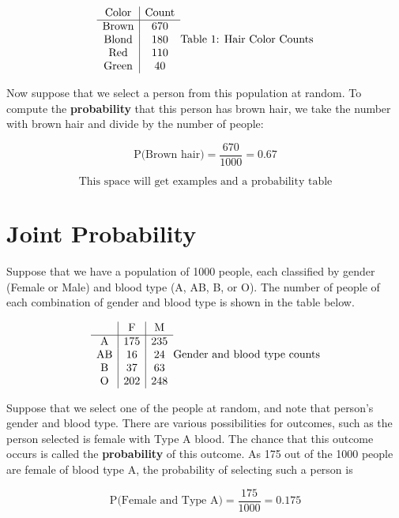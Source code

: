 \documentclass[
]{book}
\begin{document}
\[
\begin{array}{c|c}
 \mathrm{Color} & \mathrm{Count} \\ \hline
\mathrm{Brown} & 670  \\ 
\mathrm{Blond} & 180  \\ 
\mathrm{Red} & 110  \\ 
\mathrm{Green} & 40  \\ 
\end{array}\\
\mbox{Table 1: Hair Color Counts}
\]

Now suppose that we select a person from this population at random. To compute the \textbf{probability} that this person has brown hair,
we take the number with brown hair and divide by the number of people:

\[\mbox{P(Brown hair)} = \frac{670}{1000} = 0.67\]

\[\mbox{This space will get examples and a probability table}\]

\hypertarget{joint-probability}{%
\chapter{Joint Probability}\label{joint-probability}}

Suppose that we have a population of 1000 people, each classified by gender (Female or Male) and blood type (A, AB, B, or O).
The number of people of each combination of gender and blood type is shown in the table below.

\[
\begin{array}{c|c|c}
           & \mathrm{F} & \mathrm{M}\\ \hline
\mathrm{A} & 175 & 235 \\ 
\mathrm{AB} & 16 & 24 \\ 
\mathrm{B} & 37 & 63 \\ 
\mathrm{O} & 202 & 248 \\ 
\end{array}\\
\mbox{Gender and blood type counts}
\]

Suppose that we select one of the people at random, and note that person's gender and blood type.
There are various possibilities for outcomes, such as the person selected is female with Type A blood.
The chance that this outcome occurs is called the \textbf{probability} of this outcome.
As 175 out of the 1000 people are female of blood type A, the probability of selecting such a person is

\[\mbox{P(Female and Type A)} = \frac{175}{1000} = 0.175\]
\end{document}
